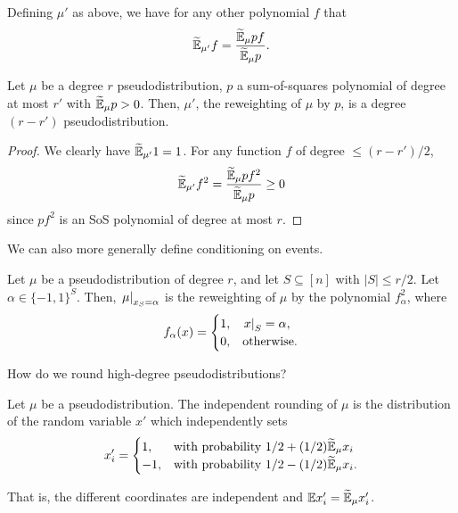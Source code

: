 	Defining $\mu'$ as above, we have for any other polynomial $f$ that
	\[ \widetilde{\mathbb{E}}_{\mu'} f = \frac{\widetilde{\mathbb{E}}_\mu pf}{\widetilde{\mathbb{E}}_\mu p}. \]

	\begin{fprop}
		Let $\mu$ be a degree $r$ pseudodistribution, $p$ a sum-of-squares polynomial of degree at most $r'$ with $\widetilde{\mathbb{E}}_\mu p > 0$. Then, $\mu'$, the reweighting of $\mu$ by $p$, is a degree $(r-r')$ pseudodistribution.
	\end{fprop}
	\begin{proof}
		We clearly have $\widetilde{\mathbb{E}}_{\mu'} 1 = 1$. For any function $f$ of degree $\le (r-r')/2$,
		\[ \widetilde{\mathbb{E}}_{\mu'} f^2 = \frac{\widetilde{\mathbb{E}}_{\mu} pf^2}{\widetilde{\mathbb{E}}_\mu p} \ge 0 \]
		since $pf^2$ is an SoS polynomial of degree at most $r$.
	\end{proof}

	We can also more generally define conditioning on events.

	\begin{fdef}[Conditioning]
		Let $\mu$ be a pseudodistribution of degree $r$, and let $S \subseteq [n]$ with $|S| \le r/2$. Let $\alpha \in \{-1,1\}^S$. Then, $\left.\mu\right|_{x_S = \alpha}$ is the reweighting of $\mu$ by the polynomial $f_\alpha^2$, where
		\[ f_\alpha(x) = \begin{cases} 1, & \left.x\right|_{S} = \alpha, \\ 0, & \text{otherwise.} \end{cases} \]
	\end{fdef}

	How do we round high-degree pseudodistributions?

	\begin{fdef}
		Let $\mu$ be a pseudodistribution. The independent rounding of $\mu$ is the distribution of the random variable $x'$ which independently sets
		\[ x_i' = \begin{cases} 1, & \text{with probability $1/2 + (1/2)\widetilde{\mathbb{E}}_\mu x_i$} \\ -1, & \text{with probability $1/2 - (1/2)\widetilde{\mathbb{E}}_\mu x_i$.} \end{cases} \]
	\end{fdef}
	That is, the different coordinates are independent and $\mathbb{E} x_i' = \widetilde{\mathbb{E}}_\mu x_i'$.

